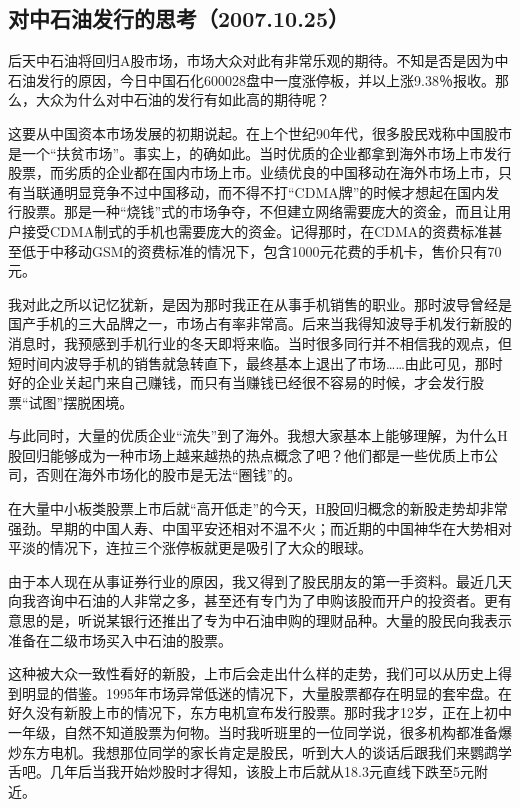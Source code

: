 \subsection{对中石油发行的思考（2007.10.25）}

后天中石油将回归A股市场，市场大众对此有非常乐观的期待。不知是否是因为中石油发行的原因，今日中国石化600028盘中一度涨停板，并以上涨9.38％报收。那么，大众为什么对中石油的发行有如此高的期待呢？

这要从中国资本市场发展的初期说起。在上个世纪90年代，很多股民戏称中国股市是一个“扶贫市场”。事实上，的确如此。当时优质的企业都拿到海外市场上市发行股票，而劣质的企业都在国内市场上市。业绩优良的中国移动在海外市场上市，只有当联通明显竞争不过中国移动，而不得不打“CDMA牌”的时候才想起在国内发行股票。那是一种“烧钱”式的市场争夺，不但建立网络需要庞大的资金，而且让用户接受CDMA制式的手机也需要庞大的资金。记得那时，在CDMA的资费标准甚至低于中移动GSM的资费标准的情况下，包含1000元花费的手机卡，售价只有70元。

我对此之所以记忆犹新，是因为那时我正在从事手机销售的职业。那时波导曾经是国产手机的三大品牌之一，市场占有率非常高。后来当我得知波导手机发行新股的消息时，我预感到手机行业的冬天即将来临。当时很多同行并不相信我的观点，但短时间内波导手机的销售就急转直下，最终基本上退出了市场……由此可见，那时好的企业关起门来自己赚钱，而只有当赚钱已经很不容易的时候，才会发行股票“试图”摆脱困境。

与此同时，大量的优质企业“流失”到了海外。我想大家基本上能够理解，为什么H股回归能够成为一种市场上越来越热的热点概念了吧？他们都是一些优质上市公司，否则在海外市场化的股市是无法“圈钱”的。

在大量中小板类股票上市后就“高开低走”的今天，H股回归概念的新股走势却非常强劲。早期的中国人寿、中国平安还相对不温不火；而近期的中国神华在大势相对平淡的情况下，连拉三个涨停板就更是吸引了大众的眼球。

由于本人现在从事证券行业的原因，我又得到了股民朋友的第一手资料。最近几天向我咨询中石油的人非常之多，甚至还有专门为了申购该股而开户的投资者。更有意思的是，听说某银行还推出了专为中石油申购的理财品种。大量的股民向我表示准备在二级市场买入中石油的股票。

这种被大众一致性看好的新股，上市后会走出什么样的走势，我们可以从历史上得到明显的借鉴。1995年市场异常低迷的情况下，大量股票都存在明显的套牢盘。在好久没有新股上市的情况下，东方电机宣布发行股票。那时我才12岁，正在上初中一年级，自然不知道股票为何物。当时我听班里的一位同学说，很多机构都准备爆炒东方电机。我想那位同学的家长肯定是股民，听到大人的谈话后跟我们来鹦鹉学舌吧。几年后当我开始炒股时才得知，该股上市后就从18.3元直线下跌至5元附近。

